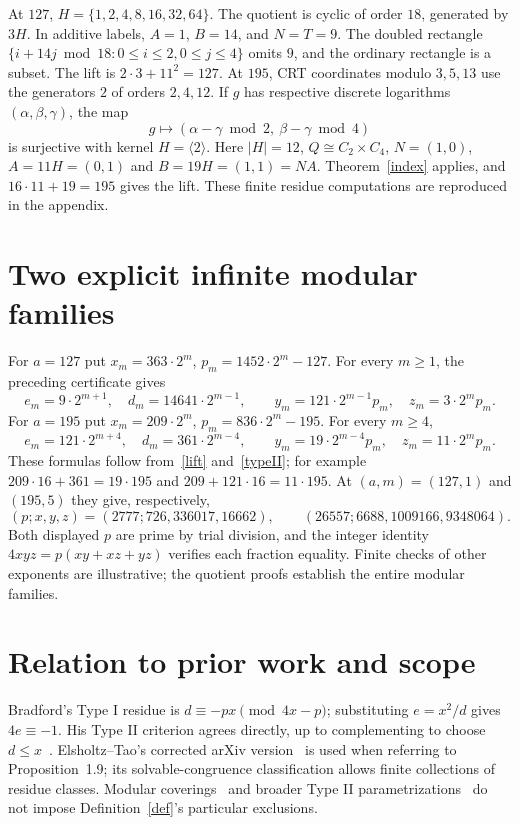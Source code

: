 \documentclass[11pt,a4paper]{article}
\theoremstyle{definition}\newtheorem{definition}[theorem]{Definition}
\begin{document}
At $127$, $H=\{1,2,4,8,16,32,64\}$. The quotient is cyclic of order $18$, generated by $3H$. In additive labels, $A=1$, $B=14$, and $N=T=9$. The doubled rectangle $\{i+14j\bmod18:0\le i\le2,0\le j\le4\}$ omits $9$, and the ordinary rectangle is a subset. The lift is $2\cdot3+11^2=127$.
At $195$, CRT coordinates modulo $3,5,13$ use the generators $2$ of orders $2,4,12$. If $g$ has respective discrete logarithms $(\alpha,\beta,\gamma)$, the map
\[
g\longmapsto(\alpha-\gamma\bmod2,\ \beta-\gamma\bmod4)
\]
is surjective with kernel $H=\langle2\rangle$. Here $|H|=12$, $Q\cong C_2\times C_4$, $N=(1,0)$, $A=11H=(0,1)$ and $B=19H=(1,1)=NA$. Theorem~\ref{index} applies, and $16\cdot11+19=195$ gives the lift. These finite residue computations are reproduced in the appendix.

\section{Two explicit infinite modular families}
For $a=127$ put $x_m=363\cdot2^m$, $p_m=1452\cdot2^m-127$. For every $m\ge1$, the preceding certificate gives
\[
e_m=9\cdot2^{m+1},\quad d_m=14641\cdot2^{m-1},\qquad
y_m=121\cdot2^{m-1}p_m,\quad z_m=3\cdot2^m p_m.
\]
For $a=195$ put $x_m=209\cdot2^m$, $p_m=836\cdot2^m-195$. For every $m\ge4$,
\[
e_m=121\cdot2^{m+4},\quad d_m=361\cdot2^{m-4},\qquad
y_m=19\cdot2^{m-4}p_m,\quad z_m=11\cdot2^m p_m.
\]
These formulas follow from~\eqref{lift} and~\eqref{typeII}; for example $209\cdot16+361=19\cdot195$ and $209+121\cdot16=11\cdot195$. At $(a,m)=(127,1)$ and $(195,5)$ they give, respectively,
\[
(p;x,y,z)=(2777;726,336017,16662),\qquad
(26557;6688,1009166,9348064).
\]
Both displayed $p$ are prime by trial division, and the integer identity $4xyz=p(xy+xz+yz)$ verifies each fraction equality. Finite checks of other exponents are illustrative; the quotient proofs establish the entire modular families.

\section{Relation to prior work and scope}
Bradford's Type I residue is $d\equiv-px\pmod{4x-p}$; substituting $e=x^2/d$ gives $4e\equiv-1$. His Type II criterion agrees directly, up to complementing to choose $d\le x$~\cite{Bradford}. Elsholtz--Tao's corrected arXiv version~\cite{ET} is used when referring to Proposition~1.9; its solvable-congruence classification allows finite collections of residue classes. Modular coverings~\cite[Proposition 3 and Corollary 1]{Salez} and broader Type II parametrizations~\cite[Theorem 1]{Chamberland} do not impose Definition~\ref{def}'s particular exclusions.
\end{document}
